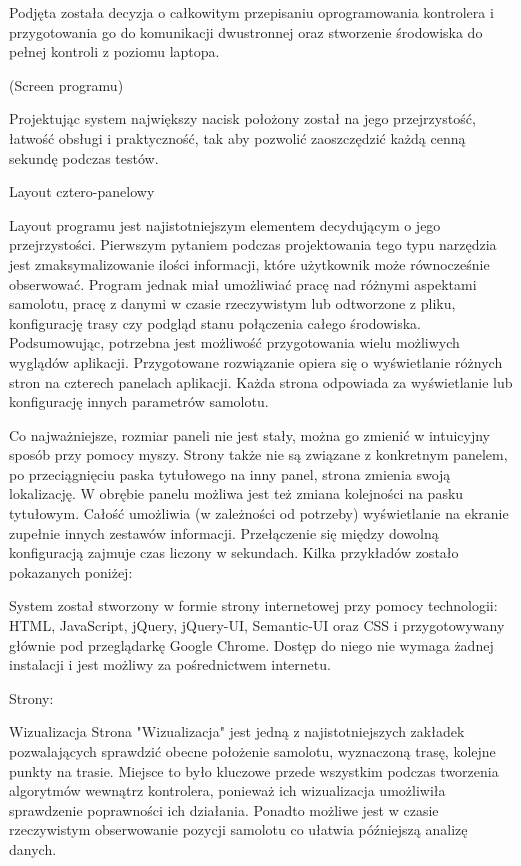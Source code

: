 \documentclass[12pt, a4paper]{article}
\begin{document}
Podjęta została decyzja o całkowitym przepisaniu oprogramowania kontrolera i przygotowania go do komunikacji dwustronnej oraz stworzenie środowiska do pełnej kontroli z poziomu laptopa. 

(Screen programu)

Projektując system największy nacisk położony został na jego przejrzystość, łatwość obsługi i praktyczność, tak aby pozwolić zaoszczędzić każdą cenną sekundę podczas testów. 

Layout cztero-panelowy

Layout programu jest najistotniejszym elementem decydującym o jego przejrzystości. Pierwszym pytaniem podczas projektowania tego typu narzędzia jest zmaksymalizowanie ilości informacji, które użytkownik może równocześnie obserwować. Program jednak miał umożliwiać pracę nad różnymi aspektami samolotu, pracę z danymi w czasie rzeczywistym lub odtworzone z pliku, konfigurację trasy czy podgląd stanu połączenia całego środowiska. Podsumowując, potrzebna jest możliwość przygotowania wielu możliwych wyglądów aplikacji. Przygotowane rozwiązanie opiera się o wyświetlanie różnych stron na czterech panelach aplikacji. Każda strona odpowiada za wyświetlanie lub konfigurację innych parametrów samolotu. 

Co najważniejsze, rozmiar paneli nie jest stały, można go zmienić w intuicyjny sposób przy pomocy myszy. Strony także nie są związane z konkretnym panelem, po przeciągnięciu paska tytułowego na inny panel, strona zmienia swoją lokalizację. W obrębie panelu możliwa jest też zmiana kolejności na pasku tytułowym.
Całość umożliwia (w zależności od potrzeby) wyświetlanie na ekranie zupełnie innych zestawów informacji. Przełączenie się między dowolną konfiguracją zajmuje czas liczony w sekundach. Kilka przykładów zostało pokazanych poniżej:

System został stworzony w formie strony internetowej przy pomocy technologii: HTML, JavaScript, jQuery, jQuery-UI, Semantic-UI oraz CSS i przygotowywany głównie pod przeglądarkę Google Chrome. Dostęp do niego nie wymaga żadnej instalacji i jest możliwy za pośrednictwem internetu. 

Strony:

Wizualizacja
Strona "Wizualizacja" jest jedną z najistotniejszych zakładek pozwalających sprawdzić obecne położenie samolotu, wyznaczoną trasę, kolejne punkty na trasie. Miejsce to było kluczowe przede wszystkim podczas tworzenia algorytmów wewnątrz kontrolera, ponieważ ich wizualizacja umożliwiła sprawdzenie poprawności ich działania. Ponadto możliwe jest w czasie rzeczywistym obserwowanie pozycji samolotu co ułatwia późniejszą analizę danych. 
\end{document}
